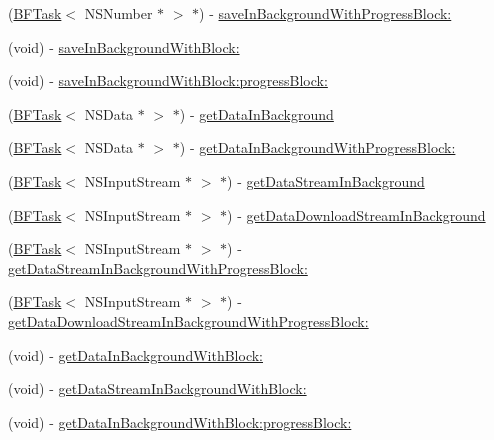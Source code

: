 \begin{DoxyCompactItemize}
\begin{DoxyCompactList}
 \end{DoxyCompactList}\item 
(\hyperlink{class_b_f_task}{B\+F\+Task}$<$ N\+S\+Number $\ast$ $>$ $\ast$) -\/ \hyperlink{interface_p_f_file_a1a768a50e6a7dd688ac5d14f803b4c80}{save\+In\+Background\+With\+Progress\+Block\+:}
\item 
(void) -\/ \hyperlink{interface_p_f_file_aa1da740a84d363bf45f29b831a1aa076}{save\+In\+Background\+With\+Block\+:}
\item 
(void) -\/ \hyperlink{interface_p_f_file_a110ca4817d9dddb215a89c75fe44b6ae}{save\+In\+Background\+With\+Block\+:progress\+Block\+:}
\item 
(\hyperlink{class_b_f_task}{B\+F\+Task}$<$ N\+S\+Data $\ast$ $>$ $\ast$) -\/ \hyperlink{interface_p_f_file_ab57f29b72d772887b8ade56746a4554c}{get\+Data\+In\+Background}
\item 
(\hyperlink{class_b_f_task}{B\+F\+Task}$<$ N\+S\+Data $\ast$ $>$ $\ast$) -\/ \hyperlink{interface_p_f_file_a322460487222fab0e41300b5afc4e133}{get\+Data\+In\+Background\+With\+Progress\+Block\+:}
\item 
(\hyperlink{class_b_f_task}{B\+F\+Task}$<$ N\+S\+Input\+Stream $\ast$ $>$ $\ast$) -\/ \hyperlink{interface_p_f_file_a866ff0d49962cf1c35ac0e6a95d5736f}{get\+Data\+Stream\+In\+Background}
\item 
(\hyperlink{class_b_f_task}{B\+F\+Task}$<$ N\+S\+Input\+Stream $\ast$ $>$ $\ast$) -\/ \hyperlink{interface_p_f_file_a17fffbd3f0ddde036c36bdecbf6123c5}{get\+Data\+Download\+Stream\+In\+Background}
\item 
(\hyperlink{class_b_f_task}{B\+F\+Task}$<$ N\+S\+Input\+Stream $\ast$ $>$ $\ast$) -\/ \hyperlink{interface_p_f_file_a66ebf6c47f4b1f96d44e3b1e9fa96103}{get\+Data\+Stream\+In\+Background\+With\+Progress\+Block\+:}
\item 
(\hyperlink{class_b_f_task}{B\+F\+Task}$<$ N\+S\+Input\+Stream $\ast$ $>$ $\ast$) -\/ \hyperlink{interface_p_f_file_aa5ca3e0d24a9e65e43b53999dda039ab}{get\+Data\+Download\+Stream\+In\+Background\+With\+Progress\+Block\+:}
\item 
(void) -\/ \hyperlink{interface_p_f_file_a8e8eec3afb497bb1aa0f9b792dff4382}{get\+Data\+In\+Background\+With\+Block\+:}
\item 
(void) -\/ \hyperlink{interface_p_f_file_aef5165460d89c6180688f664961ef277}{get\+Data\+Stream\+In\+Background\+With\+Block\+:}
\item 
(void) -\/ \hyperlink{interface_p_f_file_ada406e28708e53fc55a686f8ef4d6bb9}{get\+Data\+In\+Background\+With\+Block\+:progress\+Block\+:}

\end{DoxyCompactItemize}
